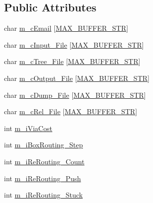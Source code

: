 \subsection*{Public Attributes}
\begin{DoxyCompactItemize}
\item 
char \mbox{\hyperlink{classCParam_add7c32d17c8df057773a38f5a2e5859d}{m\+\_\+c\+Email}} \mbox{[}\mbox{\hyperlink{BoxRouter_8h_a8e4ff1be9df93e25b23e87d9042634e4}{M\+A\+X\+\_\+\+B\+U\+F\+F\+E\+R\+\_\+\+S\+TR}}\mbox{]}
\item 
char \mbox{\hyperlink{classCParam_af16d603421e373c44ae695420da82ae4}{m\+\_\+c\+Input\+\_\+\+File}} \mbox{[}\mbox{\hyperlink{BoxRouter_8h_a8e4ff1be9df93e25b23e87d9042634e4}{M\+A\+X\+\_\+\+B\+U\+F\+F\+E\+R\+\_\+\+S\+TR}}\mbox{]}
\item 
char \mbox{\hyperlink{classCParam_a33403e9490f00b03e9b2d838188ce7ec}{m\+\_\+c\+Tree\+\_\+\+File}} \mbox{[}\mbox{\hyperlink{BoxRouter_8h_a8e4ff1be9df93e25b23e87d9042634e4}{M\+A\+X\+\_\+\+B\+U\+F\+F\+E\+R\+\_\+\+S\+TR}}\mbox{]}
\item 
char \mbox{\hyperlink{classCParam_a0d3f9803c7859719ade8aa3cbfb705fb}{m\+\_\+c\+Output\+\_\+\+File}} \mbox{[}\mbox{\hyperlink{BoxRouter_8h_a8e4ff1be9df93e25b23e87d9042634e4}{M\+A\+X\+\_\+\+B\+U\+F\+F\+E\+R\+\_\+\+S\+TR}}\mbox{]}
\item 
char \mbox{\hyperlink{classCParam_a805e2481ff9cb3c41bcf54a5fa29e816}{m\+\_\+c\+Dump\+\_\+\+File}} \mbox{[}\mbox{\hyperlink{BoxRouter_8h_a8e4ff1be9df93e25b23e87d9042634e4}{M\+A\+X\+\_\+\+B\+U\+F\+F\+E\+R\+\_\+\+S\+TR}}\mbox{]}
\item 
char \mbox{\hyperlink{classCParam_ab9d874c9263565c3e302f481d70dd605}{m\+\_\+c\+Rel\+\_\+\+File}} \mbox{[}\mbox{\hyperlink{BoxRouter_8h_a8e4ff1be9df93e25b23e87d9042634e4}{M\+A\+X\+\_\+\+B\+U\+F\+F\+E\+R\+\_\+\+S\+TR}}\mbox{]}
\item 
int \mbox{\hyperlink{classCParam_acf9d94ab238c68576d79711cd1e3f86d}{m\+\_\+i\+Via\+Cost}}
\item 
int \mbox{\hyperlink{classCParam_a401b26931e9d6e852e60ca05cc176357}{m\+\_\+i\+Box\+Routing\+\_\+\+Step}}
\item 
int \mbox{\hyperlink{classCParam_a54d8ef2144e8b85937fbca1f165ea8a8}{m\+\_\+i\+Re\+Routing\+\_\+\+Count}}
\item 
int \mbox{\hyperlink{classCParam_a3285a58839762b9221f233366e502706}{m\+\_\+i\+Re\+Routing\+\_\+\+Push}}
\item 
int \mbox{\hyperlink{classCParam_ad30c8b944f33460338828f2b8e1d2f46}{m\+\_\+i\+Re\+Routing\+\_\+\+Stuck}}

\end{DoxyCompactItemize}
